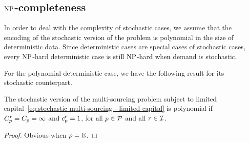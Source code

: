 \subsection{$\operatorname{NP}$-completeness}


In order to deal with the complexity of stochastic cases, we assume that the encoding of the stochastic version of the problem is polynomial in the size of deterministic data. Since deterministic cases are special cases of stochastic cases, every $\operatorname{NP}$-hard deterministic case is still $\operatorname{NP}$-hard when demand is stochastic.

For the polynomial deterministic case, we have the following result for its stochastic counterpart.

\begin{prop}
The stochastic version of the multi-sourcing problem subject to limited capital~\eqref{eq:stochastic multi-sourcing - limited capital} is polynomial if $C_p^r=C_p=\infty$ and $c_p^r=1$, for all $p\in\mathcal{P}$ and all $r\in\mathcal{I}$.
\end{prop}

\begin{proof}
Obvious when $\rho=\operatorname{\mathbb{E}}$.


\tbc
\end{proof}



